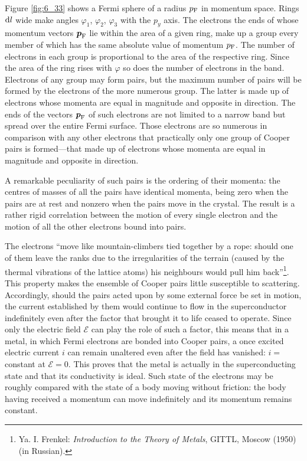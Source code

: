 Figure \ref{fig:6_33} shows a Fermi sphere of a radius $p_{\text{F}}$ in momentum space. Rings $\mathrm{d} l$ wide make angles $\varphi_1$, $\varphi_2$, $\varphi_3$ with the $p_y$ axis. The electrons the ends of whose momentum vectors $\boldsymbol{p}_{\text{F}}$ lie within the area of a given ring, make up a group every member of which has the same absolute value of momentum $p_{\text{F}}$. The number of electrons in each group is proportional to the area of the respective ring. Since the area of the ring rises with $\varphi$ so does the number of electrons in the band. Electrons of any group may form pairs, but the maximum number of pairs will be formed by the electrons of the more numerous group. The latter is made up of electrons whose momenta are equal in magnitude and opposite in direction.
The ends of the vectors $\boldsymbol{p}_{\text{F}}$ of such electrons are not limited to a narrow band but spread over the entire Fermi surface. Those electrons are so numerous in comparison with any other electrons that practically only one group of Cooper pairs is formed---that made up of electrons whose momenta are equal in magnitude and opposite in direction.

A remarkable peculiarity of such pairs is the ordering of their momenta: the centres of masses of all the pairs have identical momenta, being zero when the pairs are at rest and nonzero when the pairs move in the crystal. The result is a rather rigid correlation between the motion of every single electron and the motion of all the other electrons bound into pairs.

The electrons ``move like mountain-climbers tied together by a rope: should one of them leave the ranks due to the irregularities of the terrain (caused by the thermal vibrations of the lattice atoms) his neighbours would pull him back''\footnote{Ya. I. Frenkel: \textit{Introduction to the Theory of Metals}, GITTL, Moscow (1950) (in Russian).}. This property makes the ensemble of Cooper pairs little susceptible to scattering. Accordingly, should the pairs acted upon by some external force be set in motion, the current established by them would continue to flow in the superconductor indefinitely even after the factor that brought it to life ceased to operate. Since only the electric field $\mathcal{E}$ can play the role of such a factor, this means that in a metal, in which Fermi electrons are bonded into Cooper pairs, a once excited electric current $i$ can remain unaltered even after the field has vanished: $i = $ constant at $\mathcal{E}=0$. This proves that the metal is actually in the superconducting state and that its conductivity is ideal. Such state of the electrons may be roughly compared with the state of a body moving without friction: the body having received a momentum can move indefinitely and its momentum remains constant.


